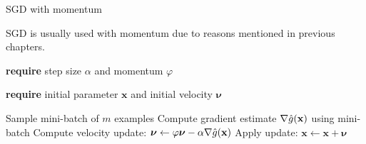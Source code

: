 \documentclass[11pt,compress,t,notes=noshow, xcolor=table]{beamer}
\begin{document}


	

	



\begin{vbframe}{SGD with momentum}
		
SGD is usually used with momentum due to reasons mentioned in previous chapters.

\begin{algorithm}[H]
    \small
    \caption{Stochastic gradient descent with momentum}
    \begin{algorithmic}[1]
        \State \textbf{require} step size $\alpha$ and momentum $\varphi$ \strut
        \State \textbf{require} initial parameter $\bm{x}$ and initial velocity $\bm{\nu}$ \strut
        \State Sample mini-batch of $m$ examples
        \State Compute gradient estimate $\nabla \hat{g}(\mathbf{x})$ using mini-batch
        \State Compute velocity update: $\bm{\nu} \leftarrow \varphi \bm{\nu} - \alpha \nabla \hat{g}(\mathbf{x})$
        \State Apply update: $\bm{x} \leftarrow \bm{x} + \bm{\nu}$
        \EndWhile
    \end{algorithmic}
\end{algorithm}

\end{vbframe}
\end{document}
